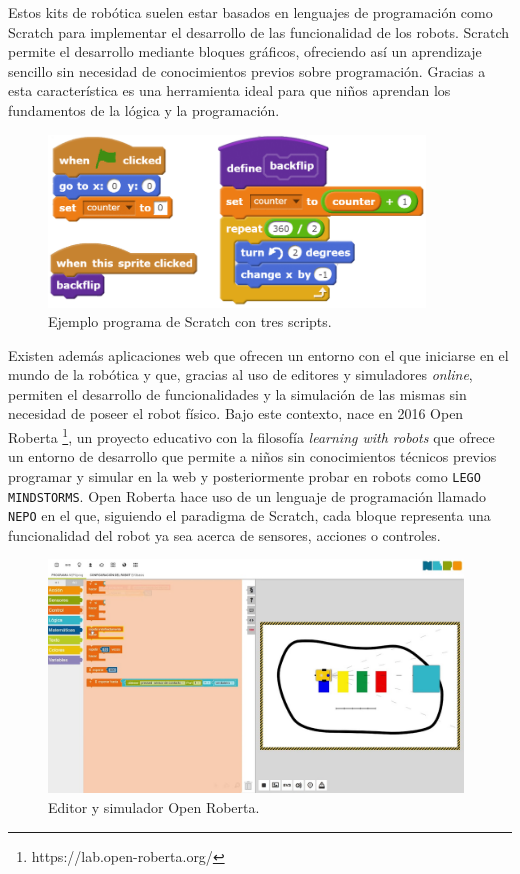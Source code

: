 \documentclass[a4paper, 12pt]{book}
\begin{document}
		Estos kits de robótica suelen estar basados en lenguajes de programación como Scratch para implementar el desarrollo de las funcionalidad de los robots. Scratch permite el desarrollo mediante bloques gráficos, ofreciendo así un aprendizaje sencillo sin necesidad de conocimientos previos sobre programación. Gracias a esta característica es una herramienta ideal para que niños aprendan los fundamentos de la lógica y la programación.
		
		\begin{figure}[H]
			\centering
			\includegraphics[width=10cm, keepaspectratio]{img/scratch.png}
			\caption{Ejemplo programa de Scratch con tres scripts.}
			\label{fig:scratch}
		\end{figure}
		
		Existen además aplicaciones web que ofrecen un entorno con el que iniciarse en el mundo de la robótica y que, gracias al uso de editores y simuladores \textit{online}, permiten el desarrollo de funcionalidades y la simulación de las mismas sin necesidad de poseer el robot físico. Bajo este contexto, nace en 2016 Open Roberta \footnote{https://lab.open-roberta.org/}, un proyecto educativo con la filosofía \textit{learning with robots} que ofrece un entorno de desarrollo que permite a niños sin conocimientos técnicos previos programar y simular en la web y posteriormente probar en robots como \texttt{LEGO MINDSTORMS}. Open Roberta hace uso de un lenguaje de programación llamado \texttt{NEPO} en el que, siguiendo el paradigma de Scratch, cada bloque representa una funcionalidad del robot ya sea acerca de sensores, acciones o controles. \\
		
		\begin{figure}[H]
			\centering
			\includegraphics[width=11cm, keepaspectratio]{img/open_roberta.jpg}
			\caption{Editor y simulador Open Roberta.}
			\label{fig:open_roberta}
		\end{figure}
		
\end{document}
